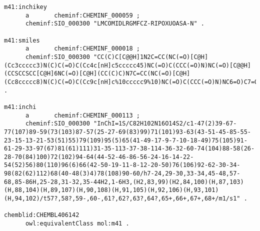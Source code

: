 \documentclass[sw]{iosart2c}
\begin{document}
\begin{tiny}
\begin{verbatim}
m41:inchikey
      a       cheminf:CHEMINF_000059 ;
      cheminf:SIO_000300 "LMCOMIDLRGMFCZ-RIPOXUOASA-N" .

m41:smiles
      a       cheminf:CHEMINF_000018 ;
      cheminf:SIO_000300 "CC(C)C[C@@H]1N2C=CC(NC(=O)[C@H](Cc3ccccc3)N(C)C(=O)C(Cc4c[nH]c5ccccc45)NC(=O)C(CCC(=O)N)NC(=O)[C@@H](CCSCCSCC[C@H]6NC(=O)[C@H](CC(C)C)N7C=CC(NC(=O)[C@H](Cc8ccccc8)N(C)C(=O)C(Cc9c[nH]c%10ccccc9%10)NC(=O)C(CCC(=O)N)NC6=O)C7=O)NC1=O)C2=O" .

m41:inchi
      a       cheminf:CHEMINF_000113 ;
      cheminf:SIO_000300 "InChI=1S/C82H102N16O14S2/c1-47(2)39-67-77(107)89-59(73(103)87-57(25-27-69(83)99)71(101)93-63(43-51-45-85-55-23-15-13-21-53(51)55)79(109)95(5)65(41-49-17-9-7-10-18-49)75(105)91-61-29-33-97(67)81(61)111)31-35-113-37-38-114-36-32-60-74(104)88-58(26-28-70(84)100)72(102)94-64(44-52-46-86-56-24-16-14-22-54(52)56)80(110)96(6)66(42-50-19-11-8-12-20-50)76(106)92-62-30-34-98(82(62)112)68(40-48(3)4)78(108)90-60/h7-24,29-30,33-34,45-48,57-68,85-86H,25-28,31-32,35-44H2,1-6H3,(H2,83,99)(H2,84,100)(H,87,103)(H,88,104)(H,89,107)(H,90,108)(H,91,105)(H,92,106)(H,93,101)(H,94,102)/t57?,58?,59-,60-,61?,62?,63?,64?,65+,66+,67+,68+/m1/s1" .

chemblid:CHEMBL406142
      owl:equivalentClass mol:m41 .


\end{verbatim}
\end{tiny}
\end{document}
